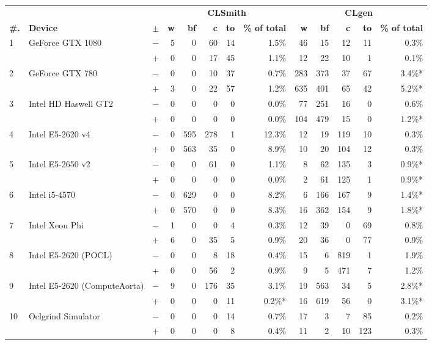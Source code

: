   \begin{tabular}{lll | rrrrr | rrrrr }
  \toprule
  & & & \multicolumn{5}{c|}{\textbf{CLSmith}} & \multicolumn{5}{c}{\textbf{CLgen}} \\
  \textbf{\#.} & \textbf{Device} & $\pm$ &
  \textbf{w} & \textbf{bf} & \textbf{c} & \textbf{to} & \textbf{\% of total} &
  \textbf{w} & \textbf{bf} & \textbf{c} & \textbf{to} & \textbf{\% of total} \\
  \midrule
  \multirow{ 2}{*}{1} & \multirow{ 2}{*}{GeForce GTX 1080} & $-$ & 5 & 0 & 60 & 14 & 1.5\%       & 46 & 15 & 12 & 11 & 0.3\% \\& & $+$ & 0 & 0 & 17 & 45 & 1.1\% & 12 & 22 & 10 & 1 & 0.1\% \\
\hline
\multirow{ 2}{*}{2} & \multirow{ 2}{*}{GeForce GTX 780} & $-$ & 0 & 0 & 10 & 37 & 0.7\%       & 283 & 373 & 37 & 67 & 3.4\%* \\& & $+$ & 3 & 0 & 22 & 57 & 1.2\% & 635 & 401 & 65 & 42 & 5.2\%* \\
\hline
\multirow{ 2}{*}{3} & \multirow{ 2}{*}{Intel HD Haswell GT2} & $-$ & 0 & 0 & 0 & 0 & 0.0\%       & 77 & 251 & 16 & 0 & 0.6\% \\& & $+$ & 0 & 0 & 0 & 0 & 0.0\% & 104 & 479 & 15 & 0 & 1.2\%* \\
\hline
\multirow{ 2}{*}{4} & \multirow{ 2}{*}{Intel E5-2620 v4} & $-$ & 0 & 595 & 278 & 1 & 12.3\%       & 12 & 19 & 119 & 10 & 0.3\% \\& & $+$ & 0 & 563 & 35 & 0 & 8.9\% & 10 & 20 & 104 & 12 & 0.3\% \\
\hline
\multirow{ 2}{*}{5} & \multirow{ 2}{*}{Intel E5-2650 v2} & $-$ & 0 & 0 & 61 & 0 & 1.1\%       & 8 & 62 & 135 & 3 & 0.9\%* \\& & $+$ & 0 & 0 & 0 & 0 & 0.0\% & 2 & 61 & 125 & 1 & 0.9\%* \\
\hline
\multirow{ 2}{*}{6} & \multirow{ 2}{*}{Intel i5-4570} & $-$ & 0 & 629 & 0 & 0 & 8.2\%       & 6 & 166 & 167 & 9 & 1.4\%* \\& & $+$ & 0 & 570 & 0 & 0 & 8.3\% & 16 & 362 & 154 & 9 & 1.8\%* \\
\hline
\multirow{ 2}{*}{7} & \multirow{ 2}{*}{Intel Xeon Phi} & $-$ & 1 & 0 & 0 & 4 & 0.3\%       & 12 & 39 & 0 & 69 & 0.8\% \\& & $+$ & 6 & 0 & 35 & 5 & 0.9\% & 20 & 36 & 0 & 77 & 0.9\% \\
\hline
\multirow{ 2}{*}{8} & \multirow{ 2}{*}{Intel E5-2620 (POCL)} & $-$ & 0 & 0 & 8 & 18 & 0.4\%       & 15 & 6 & 819 & 1 & 1.9\% \\& & $+$ & 0 & 0 & 56 & 2 & 0.9\% & 9 & 5 & 471 & 7 & 1.2\% \\
\hline
\multirow{ 2}{*}{9} & \multirow{ 2}{*}{Intel E5-2620 (ComputeAorta)} & $-$ & 9 & 0 & 176 & 35 & 3.1\%       & 19 & 563 & 34 & 5 & 2.8\%* \\& & $+$ & 0 & 0 & 0 & 11 & 0.2\%* & 16 & 619 & 56 & 0 & 3.1\%* \\
\hline
\multirow{ 2}{*}{10} & \multirow{ 2}{*}{Oclgrind Simulator} & $-$ & 0 & 0 & 0 & 14 & 0.7\%       & 17 & 3 & 7 & 85 & 0.2\% \\& & $+$ & 0 & 0 & 0 & 8 & 0.4\% & 11 & 2 & 10 & 123 & 0.3\% \\
  \bottomrule
\end{tabular}

